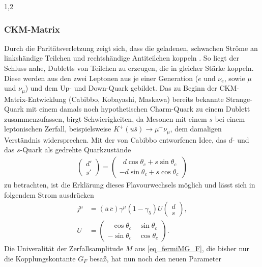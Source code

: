 \documentclass[11pt,a4paper,twoside]{report}
\begin{document}
\begin{spacing}{1,2}
\subsubsection{CKM-Matrix}
Durch die Paritätsverletzung zeigt sich, dass die geladenen, schwachen Ströme an linkshändige Teilchen und rechtshändige Antiteilchen koppeln \cite{DissForm}\cite{Sibold}. 
So liegt der Schluss nahe, Dubletts von Teilchen zu erzeugen, die in gleicher Stärke koppeln. Diese werden aus den zwei Leptonen aus je einer Generation 
($e$ und $\nu_e$, sowie $\mu$ und $\nu_\mu$) und dem Up- und Down-Quark gebildet. Das zu Beginn der CKM-Matrix-Entwicklung (Cabibbo, Kobayashi, Maskawa) 
bereits bekannte Strange-Quark
mit einem damals noch hypothetischen Charm-Quark zu einem Dublett zusammenzufassen, birgt Schwierigkeiten, da Mesonen mit einem $s$ bei einem leptonischen
Zerfall, beispielsweise $K^+(u\bar s) \rightarrow \mu^+ \nu_\mu$, dem damaligen Verständnis widersprechen. Mit der von Cabibbo entworfenen Idee, das $d$-
und das $s$-Quark als gedrehte Quarkzustände 
\begin{align}
 \begin{pmatrix}
  d'\\
  s'
 \end{pmatrix} = \begin{pmatrix}
		  \,\,\,d \cos \theta_c + s \sin \theta_c\\
		  -d \sin \theta_c + s\cos \theta_c
		  \end{pmatrix}
\end{align}
zu betrachten, ist die Erklärung dieses Flavourwechsels möglich und lässt sich in folgendem Strom ausdrücken
\begin{align}
 j^\mu &= (\bar u\, \bar c) \gamma^\mu (1-\gamma_5) U \begin{pmatrix}
                                                      d\\
                                                      s
                                                     \end{pmatrix},\\
 U &= \begin{pmatrix}
      \,\,\,\,\cos \theta_c\quad \sin \theta_c\\
      -\sin \theta_c\quad \cos \theta_c
     \end{pmatrix}.
\end{align}
Die Univeralität der Zerfallsamplitude $M$ aus \eqref{eq_fermiMG_F}, die bisher nur die Kopplungskontante $G_F$ besaß, hat nun noch den neuen Parameter

\end{spacing}
\end{document}
